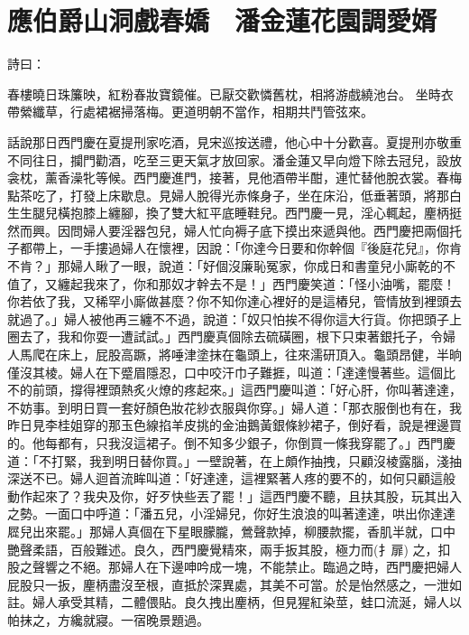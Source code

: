 %

\chapter{應伯爵山洞戲春嬌　潘金蓮花園調愛婿}

詩曰：

春樓曉日珠簾映，紅粉春妝寶鏡催。已厭交歡憐舊枕，相將游戲繞池台。
坐時衣帶縈纖草，行處裙裾掃落梅。更道明朝不當作，相期共鬥管弦來。

話說那日西門慶在夏提刑家吃酒，見宋巡按送禮，他心中十分歡喜。夏提刑亦敬重不同往日，攔門勸酒，吃至三更天氣才放回家。潘金蓮又早向燈下除去冠兒，設放衾枕，薰香澡牝等候。西門慶進門，接著，見他酒帶半酣，連忙替他脫衣裳。春梅點茶吃了，打發上床歇息。見婦人脫得光赤條身子，坐在床沿，低垂著頭，將那白生生腿兒橫抱膝上纏腳，換了雙大紅平底睡鞋兒。西門慶一見，淫心輒起，麈柄挺然而興。因問婦人要淫器包兒，婦人忙向褥子底下摸出來遞與他。西門慶把兩個托子都帶上，一手摟過婦人在懷裡，因說：「你達今日要和你幹個『後庭花兒』，你肯不肯？」那婦人瞅了一眼，說道：「好個沒廉恥冤家，你成日和書童兒小廝乾的不值了，又纏起我來了，你和那奴才幹去不是！」西門慶笑道：「怪小油嘴，罷麼！你若依了我，又稀罕小廝做甚麼？你不知你達心裡好的是這樁兒，管情放到裡頭去就過了。」婦人被他再三纏不不過，說道：「奴只怕挨不得你這大行貨。你把頭子上圈去了，我和你耍一遭試試。」西門慶真個除去硫磺圈，根下只束著銀托子，令婦人馬爬在床上，屁股高蹶，將唾津塗抹在龜頭上，往來濡研頂入。龜頭昂健，半晌僅沒其棱。婦人在下蹙眉隱忍，口中咬汗巾子難捱，叫道：「達達慢著些。這個比不的前頭，撐得裡頭熱炙火燎的疼起來。」這西門慶叫道：「好心肝，你叫著達達，不妨事。到明日買一套好顏色妝花紗衣服與你穿。」婦人道：「那衣服倒也有在，我昨日見李桂姐穿的那玉色線掐羊皮挑的金油鵝黃銀條紗裙子，倒好看，說是裡邊買的。他每都有，只我沒這裙子。倒不知多少銀子，你倒買一條我穿罷了。」西門慶道：「不打緊，我到明日替你買。」一壁說著，在上頗作抽拽，只顧沒棱露腦，淺抽深送不已。婦人迴首流眸叫道：「好達達，這裡緊著人疼的要不的，如何只顧這般動作起來了？我央及你，好歹快些丟了罷！」這西門慶不聽，且扶其股，玩其出入之勢。一面口中呼道：「潘五兒，小淫婦兒，你好生浪浪的叫著達達，哄出你達達㞞兒出來罷。」那婦人真個在下星眼朦朧，鶯聲款掉，柳腰款擺，香肌半就，口中艷聲柔語，百般難述。良久，西門慶覺精來，兩手扳其股，極力而(扌扉) 之，扣股之聲響之不絕。那婦人在下邊呻吟成一塊，不能禁止。臨過之時，西門慶把婦人屁股只一扳，麈柄盡沒至根，直抵於深異處，其美不可當。於是怡然感之，一泄如註。婦人承受其精，二體偎貼。良久拽出麈柄，但見猩紅染莖，蛙口流涎，婦人以帕抹之，方纔就寢。一宿晚景題過。

